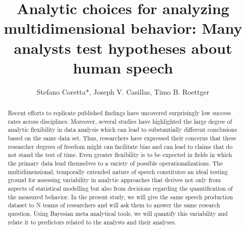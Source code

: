 \documentclass[Review,times,sageh]{sagej}
\begin{document}
\title{Analytic choices for analyzing multidimensional behavior: Many analysts test hypotheses about human speech}


\author{Stefano Coretta*, Joseph V. Casillas, Timo B. Roettger}




\begin{abstract}
Recent efforts to replicate published findings have uncovered surprisingly low success rates across disciplines. Moreover, several studies have highlighted the large degree of analytic flexibility in data analysis which can lead to substantially different conclusions based on the same data set. Thus, researchers have expressed their concerns that these researcher degrees of freedom might can facilitate bias and can lead to claims that do not stand the test of time. Even greater flexibility is to be expected in fields in which the primary data lend themselves to a variety of possible operationalizations. The multidimensional, temporally extended nature of speech constitutes an ideal testing ground for assessing variability in analytic approaches that derives not only from aspects of statistical modelling but also from decisions regarding the quantification of the measured behavior. In the present study, we will give the same speech production dataset to N teams of researchers and will ask them to answer the same research question. Using Bayesian meta analytical tools, we will quantify this variability and relate it to predictors related to the analysts and their analyses.
\end{abstract}


\maketitle
\end{document}
